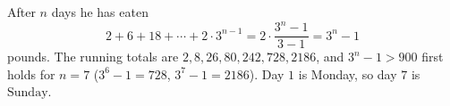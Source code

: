 After $n$ days he has eaten
\[2+6+18+\cdots+2\cdot3^{n-1}=2\cdot\dfrac{3^n-1}{3-1}=3^n-1\]
pounds. The running totals are $2,8,26,80,242,728,2186$, and $3^n-1>900$ first holds for $n=7$ ($3^6-1=728$, $3^7-1=2186$). Day $1$ is Monday, so day $7$ is $\boxed{\text{Sunday}}$.
